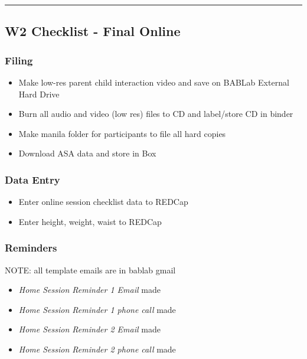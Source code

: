 \documentclass[]{book}
\providecommand{\tightlist}{%
  \setlength{\itemsep}{0pt}\setlength{\parskip}{0pt}}
\begin{document}
\begin{center}\rule{0.5\linewidth}{0.5pt}\end{center}

\hypertarget{w2-checklist---final-online}{%
\subsection{W2 Checklist - Final Online}\label{w2-checklist---final-online}}

\hypertarget{filing-6}{%
\subsubsection{Filing}\label{filing-6}}

\begin{itemize}
\tightlist
\item
  Make low-res parent child interaction video and save on BABLab External Hard Drive
\item
  Burn all audio and video (low res) files to CD and label/store CD in binder
\item
  Make manila folder for participants to file all hard copies
\item
  Download ASA data and store in Box
\end{itemize}

\hypertarget{data-entry-4}{%
\subsubsection{Data Entry}\label{data-entry-4}}

\begin{itemize}
\tightlist
\item
  Enter online session checklist data to REDCap
\item
  Enter height, weight, waist to REDCap
\end{itemize}

\hypertarget{reminders-4}{%
\subsubsection{Reminders}\label{reminders-4}}

NOTE: all template emails are in bablab gmail

\begin{itemize}
\tightlist
\item
  \emph{Home Session Reminder 1 Email} made
\item
  \emph{Home Session Reminder 1 phone call} made
\item
  \emph{Home Session Reminder 2 Email} made
\item
  \emph{Home Session Reminder 2 phone call} made
\end{itemize}
\end{document}
